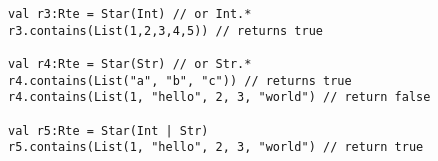 \begin{lstlisting}[style=scalaioScala]
val r3:Rte = Star(Int) // or Int.*
r3.contains(List(1,2,3,4,5)) // returns true

val r4:Rte = Star(Str) // or Str.*
r4.contains(List("a", "b", "c")) // returns true
r4.contains(List(1, "hello", 2, 3, "world") // return false

val r5:Rte = Star(Int | Str) 
r5.contains(List(1, "hello", 2, 3, "world") // return true
\end{lstlisting}
